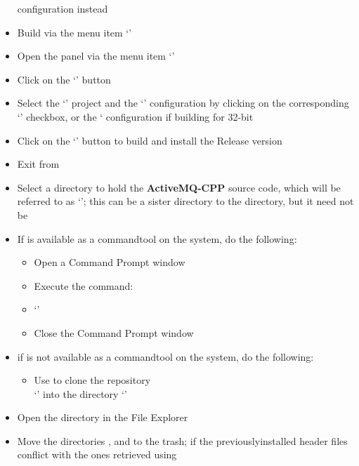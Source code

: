 \begin{itemize}
configuration instead
\item\exSp{}Build via the menu item `'
\item\exSp{}Open the  panel via the menu item
`'
\item\exSp{}Click on the `' button
\item\exSp{}Select the `' project and the `'
configuration by clicking on the corresponding `' checkbox, or the
` configuration if building for 32-bit
\item\exSp{}Click on the `' button to build and install the Release
version
\item\exSp{}Exit from 
\item\exSp{}Select a directory to hold the \textbf{ActiveMQ-CPP} source code, which will
be referred to as `'; this can be a sister directory to the
 directory, but it need not be
\item\exSp{}If  is available as a command\longDash{}tool on the system, do the
following:
\begin{itemize}
\item Open a Command Prompt window
\item\exSp{}Execute the command:
\item `'
\item\exSp{}Close the Command Prompt window
\end{itemize}
\item\exSp{}if  is not available as a command\longDash{}tool on the system, do
the following:
\begin{itemize}
\item Use  to clone the repository\\
`' into the directory
`'
\end{itemize}
\item\exSp{}Open the directory  in the File Explorer
\item\exSp{}Move the directories ,  and  to the
trash;
if the previously\longDash{}installed header files conflict with the ones retrieved using

\end{itemize}
